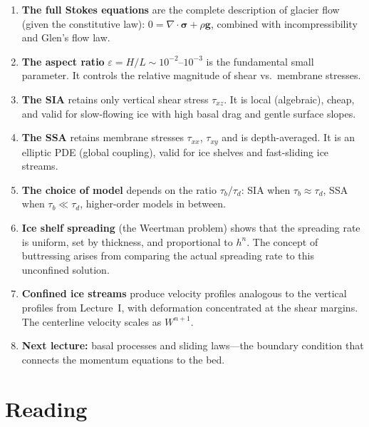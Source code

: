 \documentclass[11pt]{article}
\begin{document}
\begin{enumerate}
  \item \textbf{The full Stokes equations} are the complete description of glacier flow (given the constitutive law): $0 = \nabla\cdot\bm{\sigma} + \rho\bm{g}$, combined with incompressibility and Glen's flow law.

  \item \textbf{The aspect ratio} $\varepsilon = H/L \sim 10^{-2}$--$10^{-3}$ is the fundamental small parameter.  It controls the relative magnitude of shear vs.\ membrane stresses.

  \item \textbf{The SIA} retains only vertical shear stress $\tau_{xz}$.  It is local (algebraic), cheap, and valid for slow-flowing ice with high basal drag and gentle surface slopes.

  \item \textbf{The SSA} retains membrane stresses $\tau_{xx}$, $\tau_{xy}$ and is depth-averaged.  It is an elliptic PDE (global coupling), valid for ice shelves and fast-sliding ice streams.

  \item \textbf{The choice of model} depends on the ratio $\tau_b/\tau_d$: SIA when $\tau_b \approx \tau_d$, SSA when $\tau_b \ll \tau_d$, higher-order models in between.

  \item \textbf{Ice shelf spreading} (the Weertman problem) shows that the spreading rate is uniform, set by thickness, and proportional to $h^n$.  The concept of buttressing arises from comparing the actual spreading rate to this unconfined solution.

  \item \textbf{Confined ice streams} produce velocity profiles analogous to the vertical profiles from Lecture~I, with deformation concentrated at the shear margins.  The centerline velocity scales as $W^{n+1}$.

  \item \textbf{Next lecture:} basal processes and sliding laws---the boundary condition that connects the momentum equations to the bed.
\end{enumerate}

\section*{Reading}
\end{document}
